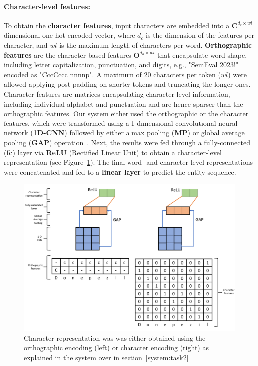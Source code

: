 \documentclass[11pt]{article}
\begin{document}
\paragraph{Character-level features: } 
%
To obtain the \textbf{character features}, input characters are embedded into a $\mathbf{C}^{d_{c} \times wl}$ dimensional one-hot encoded vector, where $d_{c}$ is the dimension of the features per character, and $wl$ is the maximum length of characters per word.
\textbf{Orthographic features} are the character-based features $\mathbf{O}^{d_{o} \times wl}$ that encapsulate word shape, including letter capitalization, punctuation, and digits, e.g., "SemEval 2023!" encoded as "CccCccc nnnnp". 
A maximum of 20 characters per token ($wl$) were allowed applying post-padding on shorter tokens and truncating the longer ones.
Character features are matrices encapsulating character-level information, including individual alphabet and punctuation and are hence sparser than the orthographic features.
Our system either used the orthographic or the character features, which were transformed using a 1-dimensional convolutional neural network (\textbf{1D-CNN}) followed by either a max pooling (\textbf{MP}) or global average pooling (\textbf{GAP}) operation~\cite{zhou2016learning}.
Next, the results were fed through a fully-connected (\textbf{fc}) layer via \textbf{ReLU} (Rectified Linear Unit) to obtain a character-level representation (see Figure~\ref{fig:task2_char}).
The final word- and character-level representations were concatenated and fed to a \textbf{linear layer} to predict the entity sequence.
%
%
%
\begin{figure}[!htbp]
    \centering
    \includegraphics[width=\columnwidth]{figures/word_arch2.pdf}
    \caption{Character representation was was either obtained using the orthographic encoding (left) or character encoding (right) as explained in the system over in section~\ref{system:task2}}
    \label{fig:task2_char}
\end{figure}
%
%
%
\end{document}
